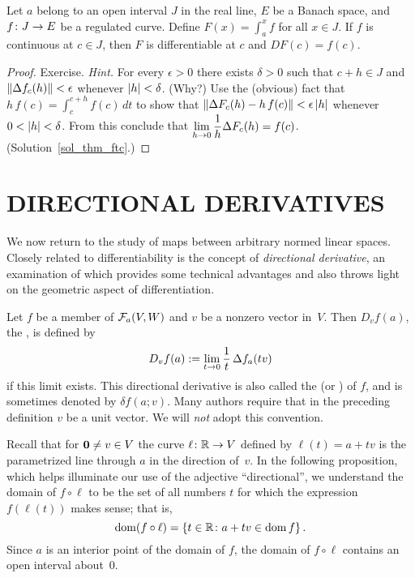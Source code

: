 \begin{thm}\label{thm_ftc}  Let $a$ belong to an open interval
$J$ in the real line, $E$ be a Banach space, and $f \colon J \rightarrow E$ be a regulated curve.
Define $F(x) = \int_a^xf$ for all $x \in J$.  If $f$ is continuous at $c \in J$, then $F$ is
differentiable at $c$ and $DF(c) = f(c)$.
\end{thm}

\begin{proof}  Exercise. \emph{Hint.}   For every $\epsilon > 0$ there exists $\delta > 0$
such that $c + h \in J$ and $\lVert\Delta f_c(h)\rVert < \epsilon$ whenever $\lvert h\rvert < \delta$.
(Why?)  Use the (obvious) fact that $h\,f(c) = \int_c^{c + h}f(c)\,dt$ to show that
$\lVert\Delta F_c(h) - h\,f(c)\rVert < \epsilon\,\lvert h\rvert$ whenever $0 < \lvert h\rvert < \delta$. From this
conclude that $\lim\limits_{h \rightarrow 0}\dfrac 1h \Delta F_c(h) = f(c)$.
(Solution~\ref{sol_thm_ftc}.)  \ns
\end{proof}




\section{DIRECTIONAL DERIVATIVES} We now return to the study of maps between arbitrary normed
linear spaces.  Closely related to differentiability is the concept of \emph{directional
derivative}, an examination of which provides some technical advantages and also throws light
on the geometric aspect of differentiation.

\begin{defn}  Let $f$ be a member of $\mathcal{F}_a(V,W)$ and $v$ be a nonzero vector in~$V$.  Then
$D_vf(a)$, the
, is defined by
  \[ D_vf(a) := \lim_{t \rightarrow 0} \frac1t\,\Delta f_a(tv)\]
if this limit exists.  This directional derivative is also called the
 (or
) of $f$, and is sometimes denoted by $\delta f(a;v)$. Many authors
require that in the preceding definition $v$ be a unit vector.  We will \emph{not} adopt this
convention.
\end{defn}

Recall that for $\mathbf{0} \ne v \in V$ the curve $\ell \colon \mathbb{R} \rightarrow V$ defined by $\ell(t) = a
+ tv$ is the parametrized line through $a$ in the direction of~$v$.  In the following
proposition, which helps illuminate our use of the adjective ``directional'', we understand
the domain of $f \circ \ell$ to be the set of all numbers $t$ for which the expression
$f(\ell(t))$ makes sense; that is,
  \[ \operatorname{dom}(f \circ \ell) = \{t \in \mathbb{R} \colon  a + tv \in \operatorname{dom} f\}\,. \]
Since $a$ is an interior point of the domain of $f$, the domain of $f \circ \ell$ contains an
open interval about~$0$.

